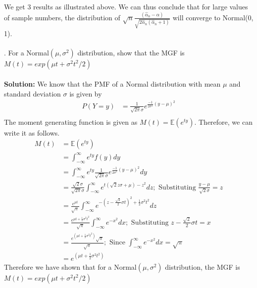 \documentclass[11pt]{article}
\begin{document}
\noindent We get 3 results as illustrated above. We can thus conclude that for large values of sample numbers, the distribution of $\sqrt{n}\frac{(\hat{\alpha}_{n} - \alpha)}{\sqrt{2 \hat{\alpha}_{n}(\hat{\alpha}_{n} + 1)}}$ will converge to Normal(0, 1).\\ \\
. For a Normal$(\mu, \sigma^{2})$ distribution, show that the MGF is $M(t) = exp(\mu t + \sigma^{2}t^{2}/2)$\\ \\
\textbf{Solution:} We know that the PMF of a Normal distribution with mean $\mu$ and standard deviation $\sigma$ is given by
\begin{equation}
  \nonumber
  \begin{aligned}
    P(Y = y) & = \frac{1}{\sqrt{2\pi}{\sigma}}e^{\frac{-1}{2\sigma^{2}}(y  - \mu)^{2}}\\
  \end{aligned}
\end{equation}
The moment generating function is given as $M(t) = \mathbb{E}(e^{ty})$. Therefore, we can write it as follows.
\begin{equation}
  \nonumber
  \begin{aligned}
    M(t) & = \mathbb{E}(e^{ty})\\
    & = \int_{-\infty}^{\infty}e^{ty}f(y)dy\\
    & = \int_{-\infty}^{\infty}e^{ty}\frac{1}{\sqrt{2\pi}{\sigma}}e^{\frac{-1}{2\sigma^{2}}(y  - \mu)^{2}}dy\\
    & = \frac{\sqrt{2}\sigma}{\sqrt{2\pi}\sigma}\int_{-\infty}^{\infty}e^{t(\sqrt{2}z\sigma+\mu)-z^{2}}dz; \text{ Substituting } \frac{y - \mu}{\sqrt{2}\sigma} = z\\
    & = \frac{e^{\mu t}}{\sqrt{\pi}}\int_{-\infty}^{\infty}e^{-(z - \frac{\sqrt{2}}{2}\sigma t)^{2} + \frac{1}{2}\sigma^{2}t^{2}} dz\\
    & = \frac{e^{\mu t + \frac{1}{2}\sigma^{2}t^{2}}}{\sqrt{\pi}} \int_{-\infty}^{\infty}e^{-x^{2}}dx; \text{ Substituting } z - \frac{\sqrt{2}}{2}\sigma t = x\\
    & =  \frac{e^{(\mu t + \frac{1}{2}\sigma^{2}t^{2})}\sqrt{\pi}}{\sqrt{\pi}}; \text{ Since }\int_{-\infty}^{\infty}e^{-x^{2}}dx = \sqrt{\pi}\\
    & = e^{(\mu t + \frac{1}{2}\sigma^{2}t^{2})}
  \end{aligned}
\end{equation}
Therefore we have shown that for a Normal$(\mu, \sigma^{2})$ distribution, the MGF is $M(t) = exp(\mu t + \sigma^{2}t^{2}/2)$\\ \\
\end{document}
